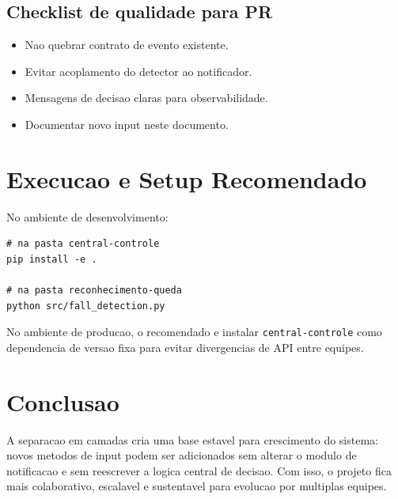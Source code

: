 \documentclass[12pt,a4paper]{article}
\begin{document}
\subsection*{Checklist de qualidade para PR}
\begin{itemize}
    \item[ ] Nao quebrar contrato de evento existente.
    \item[ ] Evitar acoplamento do detector ao notificador.
    \item[ ] Mensagens de decisao claras para observabilidade.
    \item[ ] Documentar novo input neste documento.
\end{itemize}

\section{Execucao e Setup Recomendado}
No ambiente de desenvolvimento:
\begin{lstlisting}[style=py]
# na pasta central-controle
pip install -e .

# na pasta reconhecimento-queda
python src/fall_detection.py
\end{lstlisting}

No ambiente de producao, o recomendado e instalar \texttt{central-controle} como dependencia de versao fixa para evitar divergencias de API entre equipes.

\section{Conclusao}
A separacao em camadas cria uma base estavel para crescimento do sistema: novos metodos de input podem ser adicionados sem alterar o modulo de notificacao e sem reescrever a logica central de decisao. Com isso, o projeto fica mais colaborativo, escalavel e sustentavel para evolucao por multiplas equipes.
\end{document}
